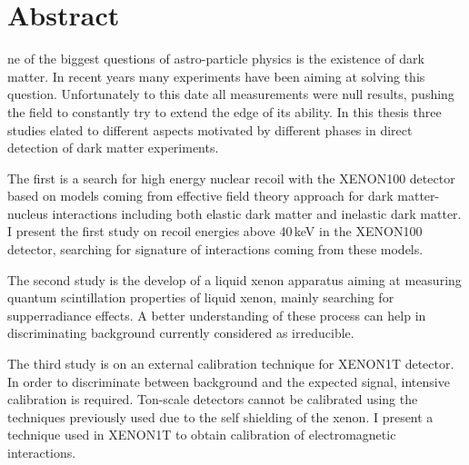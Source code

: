 %
%
%

\chapter*{Abstract}
\begin{SingleSpace}
ne of the biggest questions of astro-particle physics is the existence of dark matter. In recent years many experiments have been aiming at solving this question. Unfortunately to this date all measurements were null results, pushing the field to constantly try to extend the edge of its ability.
In this thesis three studies elated to different aspects motivated by  different phases in direct detection of dark matter experiments.

The first is a search for high energy nuclear recoil with the XENON100 detector based on models coming from effective field theory approach for dark matter-nucleus interactions including both elastic dark matter and inelastic dark matter. I present the first study on recoil energies above 40\,keV in the XENON100 detector, searching for signature of interactions coming from these models.

The second study is the develop of a liquid xenon apparatus aiming at measuring quantum scintillation properties of liquid xenon, mainly searching for supperradiance effects. A better understanding of these process can help in discriminating background currently considered as irreducible.

The third study is on an external calibration technique for XENON1T detector. In order to discriminate between background and the expected signal, intensive calibration is required. Ton-scale detectors cannot be calibrated using the techniques previously used due to the self shielding of the xenon. I present a technique used in XENON1T to obtain calibration of electromagnetic interactions. 



\end{SingleSpace}
\clearpage